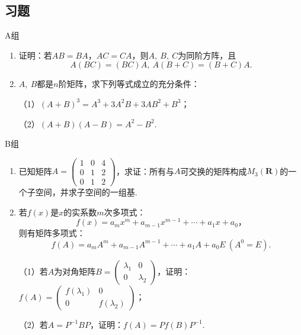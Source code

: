 \subsection{习题}
\centerline{\heiti A组}
\begin{enumerate}
	\item 证明：若$AB=BA$，$AC=CA$，则$A,\ B,\ C$为同阶方阵，且
	$$A(BC)=(BC)A,\ A(B+C)=(B+C)A.$$
	\item $A,\ B$都是$n$阶矩阵，求下列等式成立的充分条件：
	
	（1）$(A+B)^3=A^3+3A^2B+3AB^2+B^3$；

	（2）$(A+B)(A-B)=A^2-B^2$.
\end{enumerate}
\centerline{\heiti B组}
\begin{enumerate}
	\item 已知矩阵$A=\begin{pmatrix}
		1 & 0 & 4 \\ 0 & 1 & 2 \\ 0 & 1 & 2
	\end{pmatrix}$，求证：所有与$A$可交换的矩阵构成$M_3(\mathbf{R})$的一个子空间，并求子空间的一组基.
	\item 若$f(x)$是$x$的实系数$m$次多项式：
	$$f(x)=a_mx^m+a_{m-1}x^{m-1}+\cdots+a_1x+a_0，$$
	则有矩阵多项式：
	$$f(A)=a_mA^m+a_{m-1}A^{m-1}+\cdots+a_1A+a_0E\ (A^0=E).$$

	（1）若$A$为对角矩阵$B=\begin{pmatrix}
		\lambda_1 & 0 \\ 0 & \lambda_2
	\end{pmatrix}$，证明：$f(A)=\begin{pmatrix}
		f(\lambda_1) & 0 \\ 0 & f(\lambda_2)
	\end{pmatrix}$；

	（2）若$A=P^{-1}BP$，证明：$f(A)=Pf(B)P^{-1}$.
\end{enumerate}

